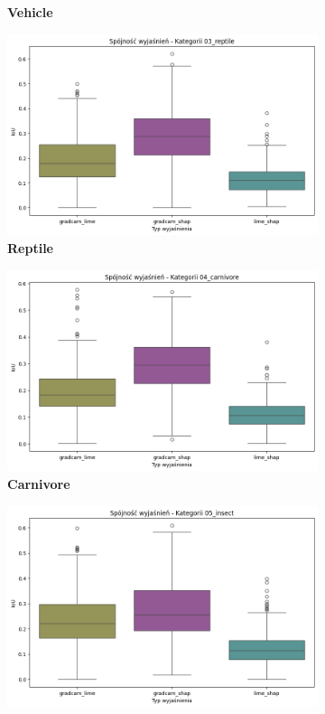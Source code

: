 \begin{figure}[h]
\begin{subfigure}[b]{0.3\textwidth}
		\caption{\textbf{Vehicle}}  \label{}
	\end{subfigure}
	\begin{subfigure}[b]{0.3\textwidth}
		\centering\includegraphics[width=.9\textwidth]{img/base_coherence_reptile}
		\caption{\textbf{Reptile}}  \label{}
	\end{subfigure}
	\begin{subfigure}[b]{0.3\textwidth}
		\centering\includegraphics[width=.9\textwidth]{img/base_coherence_carnivore}
		\caption{\textbf{Carnivore}}  \label{}
	\end{subfigure}
	\begin{subfigure}[b]{0.3\textwidth}
		\centering\includegraphics[width=.9\textwidth]{img/base_coherence_insect}

\end{subfigure}
\end{figure}

